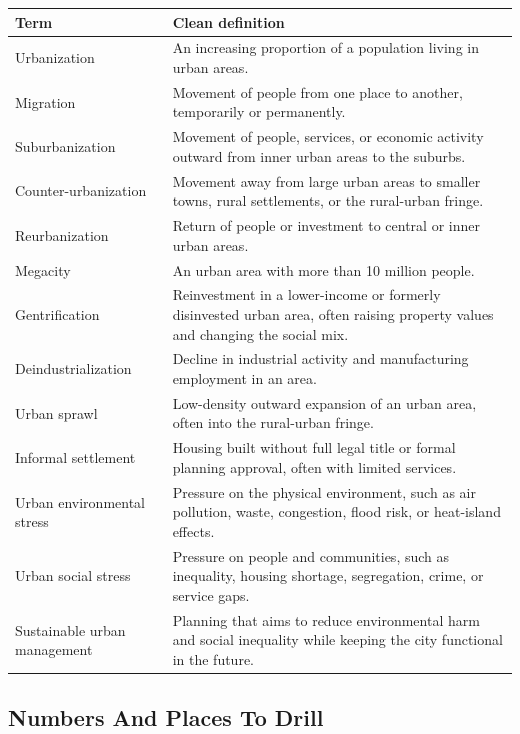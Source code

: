 \documentclass[11pt,a4paper]{article}
\begin{document}
\begin{tabularx}{\textwidth}{L{0.25\textwidth}Y}
\toprule
\textbf{Term} & \textbf{Clean definition} \\
\midrule
Urbanization & An increasing proportion of a population living in urban areas. \\
Migration & Movement of people from one place to another, temporarily or
permanently. \\
Suburbanization & Movement of people, services, or economic activity outward
from inner urban areas to the suburbs. \\
Counter-urbanization & Movement away from large urban areas to smaller towns,
rural settlements, or the rural-urban fringe. \\
Reurbanization & Return of people or investment to central or inner urban
areas. \\
Megacity & An urban area with more than 10 million people. \\
Gentrification & Reinvestment in a lower-income or formerly disinvested urban
area, often raising property values and changing the social mix. \\
Deindustrialization & Decline in industrial activity and manufacturing
employment in an area. \\
Urban sprawl & Low-density outward expansion of an urban area, often into the
rural-urban fringe. \\
Informal settlement & Housing built without full legal title or formal planning
approval, often with limited services. \\
Urban environmental stress & Pressure on the physical environment, such as air
pollution, waste, congestion, flood risk, or heat-island effects. \\
Urban social stress & Pressure on people and communities, such as inequality,
housing shortage, segregation, crime, or service gaps. \\
Sustainable urban management & Planning that aims to reduce environmental harm
and social inequality while keeping the city functional in the future. \\
\bottomrule
\end{tabularx}

\subsection{Numbers And Places To Drill}
\end{document}
